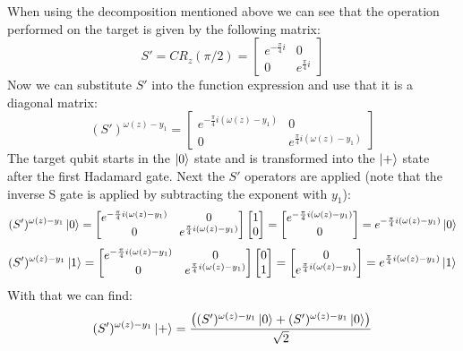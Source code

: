 \documentclass[12pt,a4paper]{article}
\begin{document}
When using the decomposition mentioned above we can see that the operation performed on the target is given by the following matrix:
\[
    S' = CR_z(\pi/2) = \begin{bmatrix}
        e^{-\frac{\pi}{4} i}  & 0\\
        0 & e^{\frac{\pi}{4} i}
    \end{bmatrix}
\]
Now we can substitute \(S'\) into the function expression and use that it is a diagonal matrix:
\[
    (S')^{\omega(z)-y_1} = 
    \begin{bmatrix}
        e^{-\frac{\pi}{4} i(\omega(z)-y_1)}  & 0\\
        0 & e^{\frac{\pi}{4} i(\omega(z)-y_1)}
    \end{bmatrix}
\]
The target qubit starts in the \(\ket{0}\) state and is transformed into the \(\ket{+}\) state after the first Hadamard gate. Next the \(S'\) operators are applied (note that the inverse S gate is applied by subtracting the exponent with \(y_1\)):
\[
(S')^{\omega(z)-y_1}\ket{0} =     \begin{bmatrix}
        e^{-\frac{\pi}{4} i(\omega(z)-y_1)}  & 0\\
        0 & e^{\frac{\pi}{4} i(\omega(z)-y_1)}
    \end{bmatrix} 
    \begin{bmatrix}
        1 \\
        0
    \end{bmatrix} = \begin{bmatrix}
         e^{-\frac{\pi}{4} i(\omega(z)-y_1)}\\
        0
    \end{bmatrix} = e^{-\frac{\pi}{4} i(\omega(z)-y_1)}\ket{0}
\]
\[
(S')^{\omega(z)-y_1}\ket{1} =     \begin{bmatrix}
        e^{-\frac{\pi}{4} i(\omega(z)-y_1)}  & 0\\
        0 & e^{\frac{\pi}{4} i(\omega(z)-y_1)}
    \end{bmatrix} 
    \begin{bmatrix}
        0 \\
        1
    \end{bmatrix} = \begin{bmatrix}
         0\\
        e^{\frac{\pi}{4} i(\omega(z)-y_1)}
    \end{bmatrix} = e^{\frac{\pi}{4} i(\omega(z)-y_1)}\ket{1}
\]
With that we can find:
\[
    (S')^{\omega(z)-y_1}\ket{+} = \frac{\left((S')^{\omega(z)-y_1}\ket{0} + (S')^{\omega(z)-y_1}\ket{0}\right)}{\sqrt{2}} 
    \]
    
\end{document}
